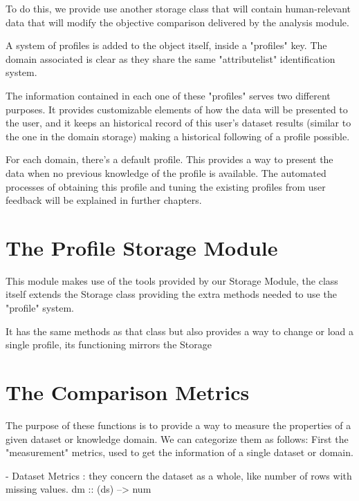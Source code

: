 To do this, we provide use another storage class that will contain human-relevant data that will modify the objective comparison delivered by the analysis module.

A system of profiles is added to the object itself, inside a "profiles" key. The domain associated is clear as they share the same "attributelist" identification system.

The information contained in each one of these "profiles" serves two different purposes. It provides customizable elements of  how  the data will be presented to the user, and it keeps an historical record of this user's dataset results (similar to the one in the domain storage) making a historical following of a profile possible.

For each domain, there's a  default  profile. This provides a way to present the data when no previous knowledge of the profile is available. The automated processes of obtaining this profile and tuning the existing profiles from user feedback will be explained in further chapters.


\section{The Profile Storage Module}
\label{cap2:sec:profilestorage}

This module makes use of the tools provided by our Storage Module, the class itself extends the Storage class providing the extra methods needed to use the "profile" system.

It has the same methods as that class but also provides a way to change or load a single profile, its functioning mirrors the Storage

\section{The Comparison Metrics}
\label{cap2:sec:metrics}

The purpose of these functions is to provide a way to measure the properties of a given dataset or knowledge domain.
We can categorize them as follows:
First the "measurement" metrics, used to get the information of a single dataset or domain.

  - Dataset Metrics : they concern the dataset as a whole, like number of rows with missing values.
    dm :: (ds) --> num
    
